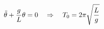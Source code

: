 \documentclass[preview]{standalone}
\begin{document}
\begin{align*}
\special{dvisvgm:raw <g id='unique000'>}\ddot{\theta} + \frac{g}{L} \theta = 0 \special{dvisvgm:raw </g>}\special{dvisvgm:raw <g id='unique001'>}\quad \Rightarrow \quad T_0 = 2\pi\sqrt{\frac{L}{g}}\special{dvisvgm:raw </g>}
\end{align*}
\end{document}
